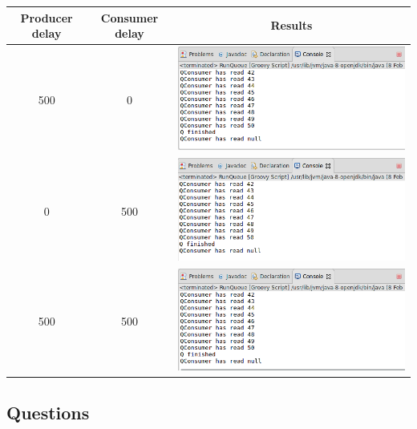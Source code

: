 \begin{tabular}{c|c|c}
	\hline

	Producer delay &
	Consumer delay &
	Results \\
	\hline

	500 &
	0 &
	\includegraphics[width=\textwidth / 2]{img/screenshots/5-1-1.png} \\
	\hline

	0 &
	500 &
	\includegraphics[width=\textwidth / 2]{img/screenshots/5-1-2.png} \\
	\hline

	500 &
	500 &
	\includegraphics[width=\textwidth / 2]{img/screenshots/5-1-3.png} \\
	\hline

\end{tabular}

\subsection{Questions}